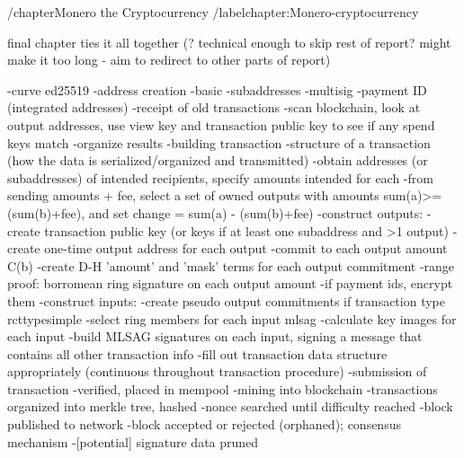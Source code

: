 /chapter{Monero the Cryptocurrency}
/label{chapter:Monero-cryptocurrency}

final chapter ties it all together (? technical enough to skip rest of report? might make it too long - aim to redirect to other parts of report)


-curve ed25519
-address creation
    -basic
    -subaddresses
    -multisig
    -payment ID (integrated addresses)
-receipt of old transactions
    -scan blockchain, look at output addresses, use view key and transaction public key to see if any spend keys match
    -organize results
-building transaction
    -structure of a transaction (how the data is serialized/organized and transmitted)
    -obtain addresses (or subaddresses) of intended recipients, specify amounts intended for each
    -from sending amounts + fee, select a set of owned outputs with amounts sum(a)>=(sum(b)+fee), and set change = sum(a) - (sum(b)+fee)
    -construct outputs:
        -create transaction public key (or keys if at least one subaddress and >1 output)
        -create one-time output address for each output
        -commit to each output amount C(b)
        -create D-H 'amount' and 'mask' terms for each output commitment
        -range proof: borromean ring signature on each output amount
        -if payment ids, encrypt them
    -construct inputs:
        -create pseudo output commitments if transaction type rcttypesimple
        -select ring members for each input mlsag
        -calculate key images for each input
        -build MLSAG signatures on each input, signing a message that contains all other transaction info
    -fill out transaction data structure appropriately (continuous throughout transaction procedure)
-submission of transaction
    -verified, placed in mempool
-mining into blockchain
    -transactions organized into merkle tree, hashed
    -nonce searched until difficulty reached
    -block published to network
    -block accepted or rejected (orphaned); consensus mechanism
    -[potential] signature data pruned